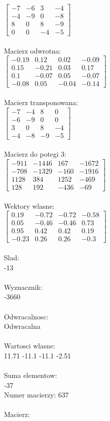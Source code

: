 \documentclass[a4paper,12pt]{article}
\begin{document}
$\begin{bmatrix} -7&-6&3&-4\\-4&-9&0&-8\\8&0&8&-9\\0&0&-4&-5 \end{bmatrix}$
\\
\\
Macierz odwrotna:\\

$\begin{bmatrix} -0.19&0.12&0.02&-0.09\\0.15&-0.21&0.03&0.17\\0.1&-0.07&0.05&-0.07\\-0.08&0.05&-0.04&-0.14 \end{bmatrix}$
\\
\\
Macierz transponowana:\\

$\begin{bmatrix} -7&-4&8&0\\-6&-9&0&0\\3&0&8&-4\\-4&-8&-9&-5 \end{bmatrix}$
\\
\\
Macierz do potegi 3:\\

$\begin{bmatrix} -911&-1446&167&-1672\\-708&-1329&-160&-1916\\1128&384&1252&-469\\128&192&-436&-69 \end{bmatrix}$
\\
\\
Wektory wlasne:\\

$\begin{bmatrix} 0.19&-0.72&-0.72&-0.58\\0.05&-0.46&-0.46&0.73\\0.95&0.42&0.42&0.19\\-0.23&0.26&0.26&-0.3 \end{bmatrix}$
\\
\\
Slad:\\
-13
\\
\\
Wyznacznik:\\
-3660
\\
\\
Odwracalnosc:\\
Odwracalna
\\
\\
Wartosci wlasne:\\
11.71 -11.1 -11.1 -2.51
\\
\\
Suma elementow:\\
-37
\\
\newpage
Numer macierzy:
637
\\
\\
Macierz:\\
\end{document}
